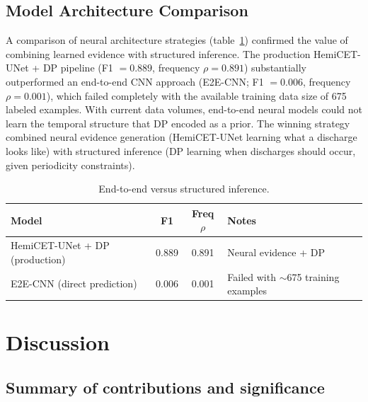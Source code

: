 \documentclass{iopjournal}
\begin{document}
\subsection{Model Architecture Comparison}
\label{sec:architecture}

A comparison of neural architecture strategies (table~\ref{tab:architecture}) confirmed the value of combining learned evidence with structured inference. The production HemiCET-UNet + DP pipeline (F1 $= 0.889$, frequency $\rho = 0.891$) substantially outperformed an end-to-end CNN approach (E2E-CNN; F1 $= 0.006$, frequency $\rho = 0.001$), which failed completely with the available training data size of 675 labeled examples. With current data volumes, end-to-end neural models could not learn the temporal structure that DP encoded as a prior. The winning strategy combined neural evidence generation (HemiCET-UNet learning what a discharge looks like) with structured inference (DP learning when discharges should occur, given periodicity constraints).

\begin{table}[t]
\caption{End-to-end versus structured inference.}
\centering
\begin{tabular}{l c c l}
\hline
Model & F1 & Freq $\rho$ & Notes \\
\hline
HemiCET-UNet + DP (production) & 0.889 & 0.891 & Neural evidence + DP \\
E2E-CNN (direct prediction) & 0.006 & 0.001 & Failed with ${\sim}$675 training examples \\
\hline
\end{tabular}
\label{tab:architecture}
\end{table}

\section{Discussion}
\label{sec:discussion}

\subsection{Summary of contributions and significance}
\label{sec:summary}
\end{document}
